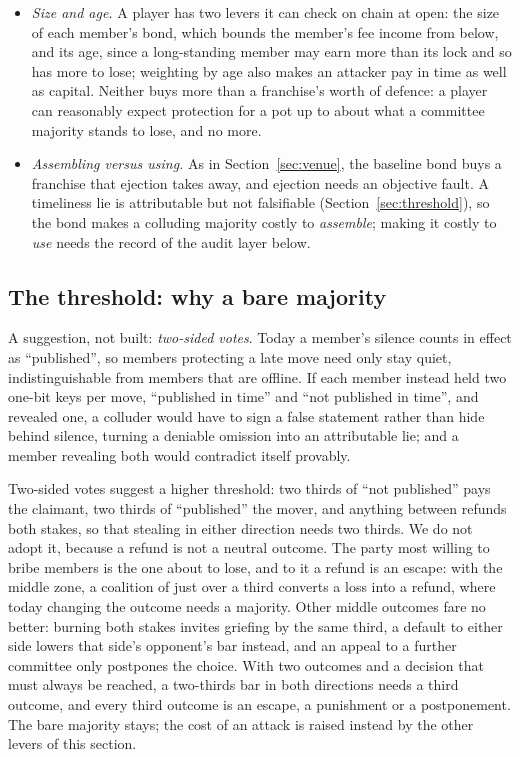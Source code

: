\documentclass[11pt]{article}
\begin{document}
\begin{itemize}
\item \emph{Size and age.} A player has two levers it can check on
  chain at open: the size of each member's bond, which bounds the
  member's fee income from below, and its age, since a long-standing
  member may earn more than its lock and so has more to lose; weighting
  by age also makes an attacker pay in time as well as capital. Neither buys more
  than a franchise's worth of defence: a player can reasonably expect
  protection for a pot up to about what a committee majority stands to
  lose, and no more.
\item \emph{Assembling versus using.} As in Section~\ref{sec:venue},
  the baseline bond buys a franchise that ejection takes away, and
  ejection needs an objective fault. A timeliness lie is
  attributable but not falsifiable
  (Section~\ref{sec:threshold}), so the bond makes a colluding
  majority costly to \emph{assemble}; making it costly to \emph{use}
  needs the record of the audit layer below.
\end{itemize}

\subsection{The threshold: why a bare majority}
\label{sec:voidzone}

A suggestion, not built: \emph{two-sided votes}. Today a member's
silence counts in effect as ``published'', so members protecting a late
move need only stay quiet, indistinguishable from members that are
offline. If each member instead held two one-bit keys per move,
``published in time'' and ``not published in time'', and revealed one,
a colluder would have to sign a false statement rather than hide behind
silence, turning a deniable omission into an attributable lie; and a
member revealing both would contradict itself provably.

Two-sided votes suggest a higher threshold: two thirds of ``not
published'' pays the claimant, two thirds of ``published'' the mover,
and anything between refunds both stakes, so that stealing in either
direction needs two thirds. We do not adopt it, because a refund is not
a neutral outcome. The party most willing to bribe members is the one
about to lose, and to it a refund is an escape: with the middle zone, a
coalition of just over a third converts a loss into a refund, where
today changing the outcome needs a majority. Other middle outcomes fare
no better: burning both stakes invites griefing by the same third, a
default to either side lowers that side's opponent's bar instead, and an
appeal to a further committee only postpones the choice. With two
outcomes and a decision that must always be reached, a two-thirds bar
in both directions needs a third outcome, and every third outcome is an
escape, a punishment or a postponement. The bare majority stays; the
cost of an attack is raised instead by the other levers of this
section.
\end{document}
